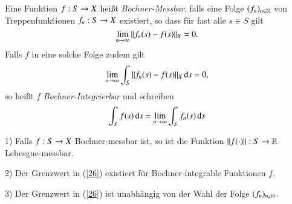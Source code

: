 \begin{defi}\label{4.22}
    Eine Funktion $f:S\rightarrow X$ heißt \textit{Bochner-Messbar}, falls eine Folge $(f_n)_{n\in\mathbb{N}}$
    von Treppenfunktionen $f_n:S\rightarrow X$ existiert, so dass für fast alle $s\in S$ gilt
    \[
        \lim_{n\rightarrow \infty} \|f_n(s)-f(s)\| _X=0.
    \]
    Falls $f$ in eine solche Folge zudem gilt
    \[
        \lim_{n\rightarrow \infty} \int_S\|f_n(s)-f(s)\|_X \, \mathrm{d} s =0,
    \]
    so heißt $f$ \textit{Bochner-Integrierbar} und schreiben
    \begin{align}\label{26}
        \int_S f(s)\, \mathrm{d} s=\lim_{n\rightarrow\infty} \int_S f_n(s)\, \mathrm{d} s
    \end{align}
\end{defi}

\begin{prop}\label{4.23}
    \begin{description}
    \item{1)}
    Falls $f:S\rightarrow X$ Bochner-messbar ist, so ist die Funktion $\|f(\cdot)\|:S\rightarrow \mathbb{R}$ Lebesgue-messbar.
    \item{2)}
    Der Grenzwert in (\ref{26}) existiert für Bochner-integrable Funktionen $f$.
    \item{3)}
    Der Grenzwert in (\ref{26}) ist unabhängig von der Wahl der Folge $(f_n)_{n_\in\mathbb{N}}$. 
    \end{description}
\end{prop}

